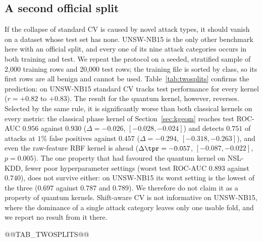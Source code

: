 \subsection{A second official split}\label{sec:kunsw}
If the collapse of standard CV is caused by novel attack types, it should vanish on a dataset whose test
set has none. UNSW-NB15 is the only other benchmark here with an official split, and every one of its
nine attack categories occurs in both training and test. We repeat the protocol on a seeded, stratified
sample of 2{,}000 training rows and 20{,}000 test rows; the training file is sorted by class, so its first
rows are all benign and cannot be used. Table~\ref{tab:twosplits} confirms the prediction: on UNSW-NB15
standard CV tracks test performance for every kernel ($r=+0.82$ to $+0.83$). The result for the quantum
kernel, however, reverses. Selected by the same rule, it is significantly worse than both classical kernels
on every metric: the classical phase kernel of Section~\ref{sec:kgeom} reaches test ROC-AUC $0.956$ against
$0.930$ ($\Delta=-0.026$, $[-0.028,-0.024]$) and detects $0.751$ of attacks at $1\%$ false positives against
$0.457$ ($\Delta=-0.294$, $[-0.318,-0.263]$), and even the raw-feature RBF kernel is ahead ($\Delta\tpr=-0.057$,
$[-0.087,-0.022]$, $p=0.005$). The one property that had favoured the quantum kernel on NSL-KDD, fewer poor
hyperparameter settings (worst test ROC-AUC $0.893$ against $0.740$), does not survive either: on
UNSW-NB15 its worst setting is the lowest of the three ($0.697$ against $0.787$ and $0.789$). We therefore do
not claim it as a property of quantum kernels. Shift-aware CV is not informative on UNSW-NB15, where the
dominance of a single attack category leaves only one usable fold, and we report no result from it there.

@@TAB_TWOSPLITS@@

